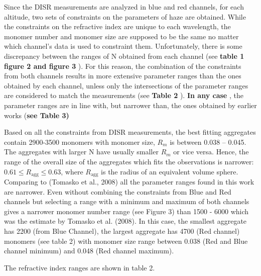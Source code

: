 \documentclass[final,5p,times,twocolumn]{elsarticle}
\begin{document}
Since the DISR measurements are analyzed in blue and red channels, for
each altitude, two sets of constraints on the parameters of haze are
obtained. While the constraints on the refractive index are unique to
each wavelength, the monomer number and monomer size are supposed to be
the same no matter which channel's data is used to constraint them.
Unfortunately, there is some discrepancy between the ranges of N
obtained from each channel (see \textbf{table 1 figure 2 and figure 3}
). For this reason, the combination of the constraints from both
channels results in more extensive parameter ranges than the ones
obtained by each channel, unless only the intersections of the parameter
ranges are considered to match the measurements (see \textbf{Table 2} ).
\textbf{In any case} , the parameter ranges are in line with, but
narrower than, the ones obtained by earlier works (\textbf{see Table 3)}

Based on all the constraints from DISR measurements, the best fitting
aggregates contain 2900-3500 monomers with monomer size,
\(R_{m}\) is between 0.038 -- 0.045. The aggregates with larger
N have usually smaller \(R_{m}\) or vice versa. Hence, the
range of the overall size of the aggregates which fits the observations
is narrower:\(0.61\leq R_{\text{agg}}\leq 0.63\), where \(R_{\text{agg}}\) is the radius
of an equivalent volume sphere. Comparing to (Tomasko et al., 2008) all
the parameter ranges found in this work are narrower. Even without
combining the constraints from Blue and Red channels but selecting a
range with a minimum and maximum of both channels gives a narrower
monomer number range (see Figure 3) than 1500 - 6000 which was the
estimate by Tomasko et al. (2008). In this case, the smallest aggregate
has 2200 (from Blue Channel), the largest aggregate has 4700 (Red
channel) monomers (see table 2) with monomer size range between 0.038
(Red and Blue channel minimum) and 0.048 (Red channel maximum).

The refractive index ranges are shown in table 2.

\FloatBarrier
\end{document}
